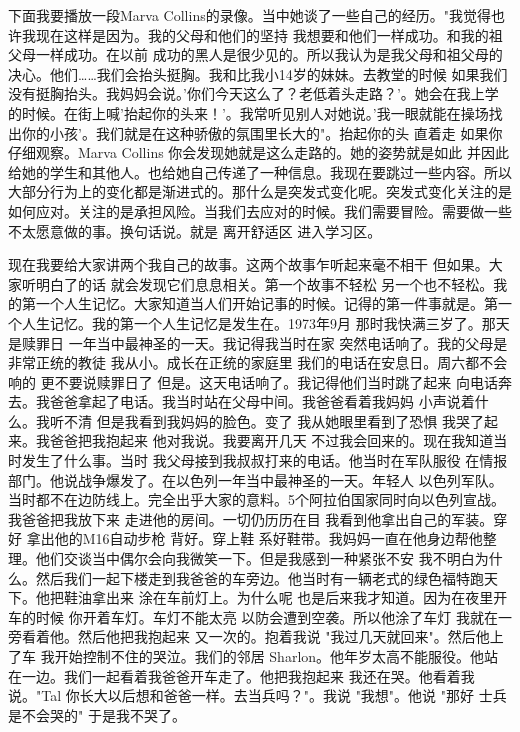 下面我要播放一段Marva Collins的录像。当中她谈了一些自己的经历。"我觉得也许我现在这样是因为。我的父母和他们的坚持 我想要和他们一样成功。和我的祖父母一样成功。在以前 成功的黑人是很少见的。所以我认为是我父母和祖父母的决心。他们……我们会抬头挺胸。我和比我小14岁的妹妹。去教堂的时候 如果我们没有挺胸抬头。我妈妈会说。'你们今天这么了？老低着头走路？'。她会在我上学的时候。在街上喊'抬起你的头来！'。我常听见别人对她说。'我一眼就能在操场找出你的小孩'。我们就是在这种骄傲的氛围里长大的"。抬起你的头 直着走 如果你仔细观察。Marva Collins 你会发现她就是这么走路的。她的姿势就是如此 并因此给她的学生和其他人。也给她自己传递了一种信息。我现在要跳过一些内容。所以大部分行为上的变化都是渐进式的。那什么是突发式变化呢。突发式变化关注的是如何应对。关注的是承担风险。当我们去应对的时候。我们需要冒险。需要做一些不太愿意做的事。换句话说。就是 离开舒适区 进入学习区。 

现在我要给大家讲两个我自己的故事。这两个故事乍听起来毫不相干 但如果。大家听明白了的话 就会发现它们息息相关。第一个故事不轻松 另一个也不轻松。我的第一个人生记忆。大家知道当人们开始记事的时候。记得的第一件事就是。第一个人生记忆。我的第一个人生记忆是发生在。1973年9月 那时我快满三岁了。那天是赎罪日 一年当中最神圣的一天。我记得我当时在家 突然电话响了。我的父母是非常正统的教徒 我从小。成长在正统的家庭里 我们的电话在安息日。周六都不会响的 更不要说赎罪日了 但是。这天电话响了。我记得他们当时跳了起来 向电话奔去。我爸爸拿起了电话。我当时站在父母中间。我爸爸看着我妈妈 小声说着什么。我听不清 但是我看到我妈妈的脸色。变了 我从她眼里看到了恐惧 我哭了起来。我爸爸把我抱起来 他对我说。我要离开几天 不过我会回来的。现在我知道当时发生了什么事。当时 我父母接到我叔叔打来的电话。他当时在军队服役 在情报部门。他说战争爆发了。在以色列一年当中最神圣的一天。年轻人 以色列军队。当时都不在边防线上。完全出乎大家的意料。5个阿拉伯国家同时向以色列宣战。我爸爸把我放下来 走进他的房间。一切仍历历在目 我看到他拿出自己的军装。穿好 拿出他的M16自动步枪 背好。穿上鞋 系好鞋带。我妈妈一直在他身边帮他整理。他们交谈当中偶尔会向我微笑一下。但是我感到一种紧张不安 我不明白为什么。然后我们一起下楼走到我爸爸的车旁边。他当时有一辆老式的绿色福特跑天下。他把鞋油拿出来 涂在车前灯上。为什么呢 也是后来我才知道。因为在夜里开车的时候 你开着车灯。车灯不能太亮 以防会遭到空袭。所以他涂了车灯 我就在一旁看着他。然后他把我抱起来 又一次的。抱着我说 "我过几天就回来"。然后他上了车 我开始控制不住的哭泣。我们的邻居 Sharlon。他年岁太高不能服役。他站在一边。我们一起看着我爸爸开车走了。他把我抱起来 我还在哭。他看着我说。"Tal 你长大以后想和爸爸一样。去当兵吗？"。我说 "我想"。他说 "那好 士兵是不会哭的" 于是我不哭了。 

